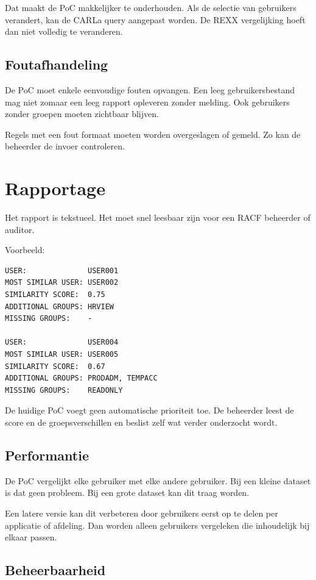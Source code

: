 Dat maakt de PoC makkelijker te onderhouden. Als de selectie van gebruikers verandert, kan de CARLa query aangepast worden. De REXX vergelijking hoeft dan niet volledig te veranderen.

\subsection*{Foutafhandeling}

De PoC moet enkele eenvoudige fouten opvangen. Een leeg gebruikersbestand mag niet zomaar een leeg rapport opleveren zonder melding. Ook gebruikers zonder groepen moeten zichtbaar blijven.

Regels met een fout formaat moeten worden overgeslagen of gemeld. Zo kan de beheerder de invoer controleren.

\section{Rapportage}

Het rapport is tekstueel. Het moet snel leesbaar zijn voor een RACF beheerder of auditor.

Voorbeeld:

\begin{verbatim}
USER:              USER001
MOST SIMILAR USER: USER002
SIMILARITY SCORE:  0.75
ADDITIONAL GROUPS: HRVIEW
MISSING GROUPS:    -

USER:              USER004
MOST SIMILAR USER: USER005
SIMILARITY SCORE:  0.67
ADDITIONAL GROUPS: PRODADM, TEMPACC
MISSING GROUPS:    READONLY
\end{verbatim}

De huidige PoC voegt geen automatische prioriteit toe. De beheerder leest de score en de groepsverschillen en beslist zelf wat verder onderzocht wordt.

\subsection*{Performantie}

De PoC vergelijkt elke gebruiker met elke andere gebruiker. Bij een kleine dataset is dat geen probleem. Bij een grote dataset kan dit traag worden.

Een latere versie kan dit verbeteren door gebruikers eerst op te delen per applicatie of afdeling. Dan worden alleen gebruikers vergeleken die inhoudelijk bij elkaar passen.

\subsection*{Beheerbaarheid}

